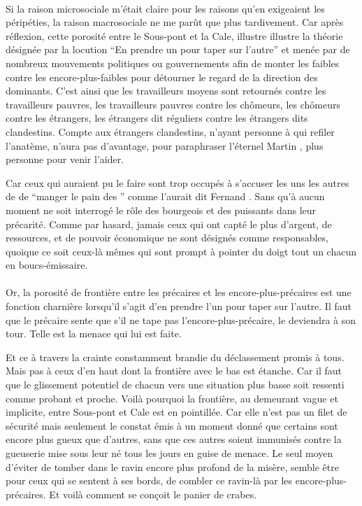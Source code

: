 \paragraph{}
Si la raison microsociale  m’était claire pour les raisons qu’en exigeaient les péripéties, la raison macrosociale ne me parût que plus tardivement.
Car après réflexion, cette porosité entre le Sous-pont et la Cale, illustre
 illustre la théorie désignée par la locution \enquote{En prendre un pour taper sur l’autre} et menée par de nombreux mouvements politiques ou gouvernements afin de monter les faibles contre les encore-plus-faibles pour détourner le regard de la direction des dominants. C’est ainsi que les travailleurs moyens sont retournés contre les travailleurs pauvres, les travailleurs pauvres  contre les chômeurs, les chômeurs contre les étrangers, les étrangers  dit réguliers contre les étrangers dits clandestins.
 Compte aux étrangers clandestins, n’ayant personne à qui refiler l’anatème, n’aura pas d’avantage, pour paraphraser l’éternel Martin , plus personne pour venir l’aider.

Car ceux qui auraient pu le faire sont trop occupés à  s’accuser les uns les autres de  de \enquote{manger le pain des } comme l’aurait dit Fernand . Sans qu’à aucun moment ne soit interrogé le rôle des bourgeois et des puissants dans leur précarité. Comme par hasard, jamais ceux qui ont capté le plus d’argent, de ressources, et de pouvoir économique ne sont désignés comme responsables, quoique ce soit ceux-là mêmes qui sont prompt à pointer du doigt tout un chacun en boucs-émissaire.

\paragraph{}
Or, la porosité de frontière entre les précaires et les encore-plus-précaires est une fonction charnière lorsqu’il s’agit d’en prendre l’un pour taper sur l’autre.
Il faut que le précaire sente que s’il ne tape pas l’encore-plus-précaire, le deviendra à son tour. Telle est la menace qui lui est faite.

Et ce à travers la crainte constamment brandie du déclassement promis à tous. Mais pas à ceux d’en haut dont la frontière avec le bas est étanche. Car il faut que le glissement potentiel de chacun vers une situation plus basse soit ressenti comme probant et proche. Voilà pourquoi la frontière, au demeurant vague et implicite, entre Sous-pont et Cale est en pointillée. Car elle n’est pas un filet de sécurité mais seulement le constat émis à un moment donné que certains sont encore plus gueux que d’autres, sans que ces autres soient immunisés contre la gueuserie mise sous leur né tous les jours en guise de menace. Le seul moyen d’éviter de tomber dans le ravin encore plus profond de la misère, semble être pour ceux qui se sentent à ses bords, de combler ce ravin-là par les encore-plus-précaires. Et voilà comment se conçoit le panier de crabes.

